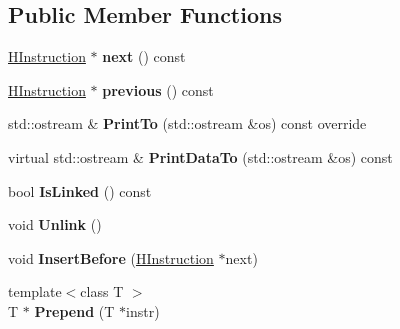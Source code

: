 \subsection*{Public Member Functions}
\begin{DoxyCompactItemize}
\item 
\hyperlink{classv8_1_1internal_1_1_h_instruction}{H\+Instruction} $\ast$ {\bfseries next} () const \hypertarget{classv8_1_1internal_1_1_h_instruction_a9d29db127d6b84d78fd83c6210c67373}{}\label{classv8_1_1internal_1_1_h_instruction_a9d29db127d6b84d78fd83c6210c67373}

\item 
\hyperlink{classv8_1_1internal_1_1_h_instruction}{H\+Instruction} $\ast$ {\bfseries previous} () const \hypertarget{classv8_1_1internal_1_1_h_instruction_aa317dc653ee98b47c0cc517785d4a8dc}{}\label{classv8_1_1internal_1_1_h_instruction_aa317dc653ee98b47c0cc517785d4a8dc}

\item 
std\+::ostream \& {\bfseries Print\+To} (std\+::ostream \&os) const  override\hypertarget{classv8_1_1internal_1_1_h_instruction_a5df6c420617bc734902de7a54a26d88c}{}\label{classv8_1_1internal_1_1_h_instruction_a5df6c420617bc734902de7a54a26d88c}

\item 
virtual std\+::ostream \& {\bfseries Print\+Data\+To} (std\+::ostream \&os) const \hypertarget{classv8_1_1internal_1_1_h_instruction_ada3a04d744c3edc9d43924c52da9b167}{}\label{classv8_1_1internal_1_1_h_instruction_ada3a04d744c3edc9d43924c52da9b167}

\item 
bool {\bfseries Is\+Linked} () const \hypertarget{classv8_1_1internal_1_1_h_instruction_a0737a8647d62e10cf5eb5edff24bbce6}{}\label{classv8_1_1internal_1_1_h_instruction_a0737a8647d62e10cf5eb5edff24bbce6}

\item 
void {\bfseries Unlink} ()\hypertarget{classv8_1_1internal_1_1_h_instruction_a8a41f7ab33dca87ccf47c3e8d0371fe0}{}\label{classv8_1_1internal_1_1_h_instruction_a8a41f7ab33dca87ccf47c3e8d0371fe0}

\item 
void {\bfseries Insert\+Before} (\hyperlink{classv8_1_1internal_1_1_h_instruction}{H\+Instruction} $\ast$next)\hypertarget{classv8_1_1internal_1_1_h_instruction_aafa2427dae17803315948b5d7271dd39}{}\label{classv8_1_1internal_1_1_h_instruction_aafa2427dae17803315948b5d7271dd39}

\item 
{\footnotesize template$<$class T $>$ }\\T $\ast$ {\bfseries Prepend} (T $\ast$instr)\hypertarget{classv8_1_1internal_1_1_h_instruction_af8ae4eebc5b54317669978c2f9d2b498}{}\label{classv8_1_1internal_1_1_h_instruction_af8ae4eebc5b54317669978c2f9d2b498}


\end{DoxyCompactItemize}
